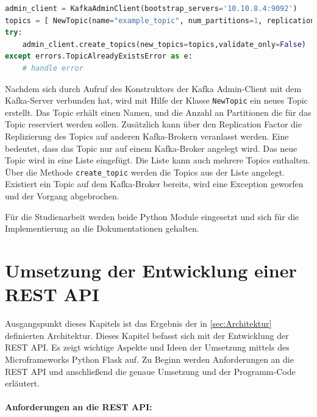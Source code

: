 \documentclass[a4paper,titlepage,halfparskip,12pt]{scrreprt}
\begin{document}
\begin{onehalfspacing}
\begin{lstlisting}[language=python, caption={Beispiel: Anlegen eines Topics mit dem KafkaAdminClient des Moduls kafka-python}, label={lst:kafkapythonAdmin}]
admin_client = KafkaAdminClient(bootstrap_servers='10.10.8.4:9092')
topics = [ NewTopic(name="example_topic", num_partitions=1, replication_factor=1) ]
try:
    admin_client.create_topics(new_topics=topics,validate_only=False)
except errors.TopicAlreadyExistsError as e:
    # handle error

\end{lstlisting}

Nachdem sich durch Aufruf des Konstruktors der Kafka Admin-Client mit dem Kafka-Server verbunden hat, wird mit Hilfe der Klasse \texttt{NewTopic} ein neues Topic erstellt. Das Topic erhält einen Namen, und die Anzahl an Partitionen die für das Topic reserviert werden sollen. Zusätzlich kann über den Replication Factor die Replizierung des Topics auf anderen Kafka-Brokern veranlasst werden. Eine \grqq bedeutet, dass das Topic nur auf einem Kafka-Broker angelegt wird. Das neue Topic wird in eine Liste eingefügt. Die Liste kann auch mehrere Topics enthalten. Über die Methode \texttt{create\_topic} werden die Topics aus der Liste angelegt. Existiert ein Topic auf dem Kafka-Broker bereits, wird eine Exception geworfen und der Vorgang abgebrochen.

Für die Studienarbeit werden beide Python Module eingesetzt und sich für die Implementierung an die Dokumentationen \cite{pykafkaDocumentation, pythonKafka} gehalten.

\pagebreak

\chapter{Umsetzung der Entwicklung einer \acs{REST} \acs{API}}
\label{subsec:Backend}

Ausgangspunkt dieses Kapitels ist das Ergebnis der in \autoref{sec:Architektur} definierten Architektur. Dieses Kapitel befasst sich mit der Entwicklung der \acs{REST} \acs{API}. Es zeigt wichtige Aspekte und Ideen der Umsetzung mittels des Microframeworks Python Flask auf. Zu Beginn werden Anforderungen an die \acs{REST} \acs{API} und anschließend die genaue Umsetzung und der Programm-Code erläutert.

\subsubsection*{Anforderungen an die \acs{REST} \acs{API}:}


\end{onehalfspacing}
\end{document}
